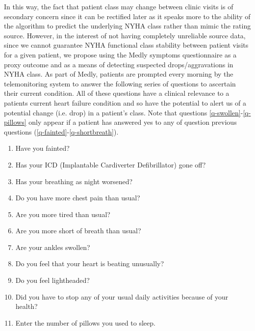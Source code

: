 \documentclass[]{article}
\begin{document}
In this way, the fact that patient class may change between clinic visits is of secondary concern since it can be rectified later as it speaks more to the ability of the algorithm to predict the underlying NYHA class rather than mimic the rating source. However, in the interest of not having completely unreliable source data, since we cannot guarantee NYHA functional class stability between patient visits for a given patient, we propose using the Medly symptoms questionnaire as a proxy outcome and as a means of detecting suspected drops/aggravations in NYHA class. As part of Medly, patients are prompted every morning by the telemonitoring system to answer the following series of questions to ascertain their current condition. All of these questions have a clinical relevance to a patients current heart failure condition and so have the potential to alert us of a potential change (i.e. drop) in a patient's class. Note that questions \ref{q-swollen}-\ref{q-pillows} only appear if a patient has answered yes to any of question previous questions (\ref{q-fainted}-\ref{q-shortbreath}).
\begin{enumerate}
	\item Have you fainted? \label{q-fainted}
	\item Has your ICD (Implantable Cardiverter Defibrillator) gone off? \label{q-icd}
	\item Has your breathing as night worsened? \label{q-worsebreath}
	\item Do you have more chest pain than usual? \label{q-chestpain}
	\item Are you more tired than usual? \label{q-tired}
	\item Are you more short of breath than usual? \label{q-shortbreath}
	\item Are your ankles swollen? \label{q-swollen}
	\item Do you feel that your heart is beating unusually? \label{q-arrhythmia}
	\item Do you feel lightheaded? \label{q-lightheaded}
	\item Did you have to stop any of your usual daily activities because of your health? \label{q-dailyactivity}
	\item Enter the number of pillows you used to sleep. \label{q-pillows}
\end{enumerate}
\end{document}
